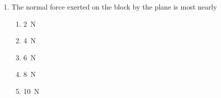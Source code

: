 \documentclass{../../oss-apphys}
\begin{document}
\begin{multicols}{2}
\begin{enumerate}[resume,leftmargin=18pt]
  \item The normal force exerted on the block by the plane is most nearly
    \begin{enumerate}[noitemsep,topsep=0pt,leftmargin=18pt,label=(\Alph*)]
    \item\SI{2}{\newton}
    \item\SI{4}{\newton}
    \item\SI{6}{\newton}
    \item\SI{8}{\newton}
    \item\SI{10}{\newton}
    \end{enumerate}
    


\end{enumerate}
\end{multicols}
\end{document}
